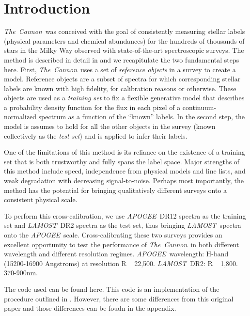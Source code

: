 \documentclass[12pt, preprint]{aastex}
\newcommand{\tc}{\textsl{The~Cannon}}
\newcommand{\apogee}{\textsl{APOGEE}}
\newcommand{\lamost}{\textsl{LAMOST}}
\begin{document}

\section{Introduction}

\tc\ was conceived with the goal of consistently measuring stellar labels 
(physical parameters and chemical abundances) for the hundreds of thousands of 
stars in the Milky Way observed with state-of-the-art spectroscopic surveys. 
The method is described in detail in \citep{ness2015} and we recapitulate the 
two fundamental steps here. First, \tc\ uses a set of \emph{reference objects}
in a survey to create a model. Reference objects are a subset of spectra for
which corresponding stellar labels are known with high fidelity, for
calibration reasons or otherwise. These objects are used as a
\emph{training set} to fix a flexible generative model that describes 
a probability density function for the flux in each pixel of a 
continuum-normalized spectrum as a function of the ``known'' labels.
In the second step, the model is assumes to hold for all the 
other objects in the survey (known collectively as the \emph{test set}) and 
is applied to infer their labels. 

One of the limitations of this method is its reliance on the existence of a 
training set that is both trustworthy and fully spans the label space.
Major strengths of this method include speed, independence from physical 
models and line lists, and weak degradation with decreasing signal-to-noise. 
Perhaps most importantly, the method has the potential for bringing 
qualitatively different surveys onto a consistent physical scale.

To perform this cross-calibration, we use \apogee\ DR12 spectra as the 
training set and \lamost\ DR2 spectra as the test set, 
thus bringing \lamost\ spectra onto the \apogee\ scale. 
Cross-calibrating these two surveys provides an excellent opportunity to test
the performance of \tc\ in both different wavelength and different resolution
regimes. \apogee\ wavelength: H-band (15200-16900 Angstroms) at resolution 
R ~ 22,500. \lamost\ DR2: R ~ 1,800. 370-900nm. 

The code used can be found here. This code is an implementation of the 
procedure outlined in \citep{ness2015}. However, there are some differences
from this original paper and those differences can be foudn in the appendix.
\end{document}
